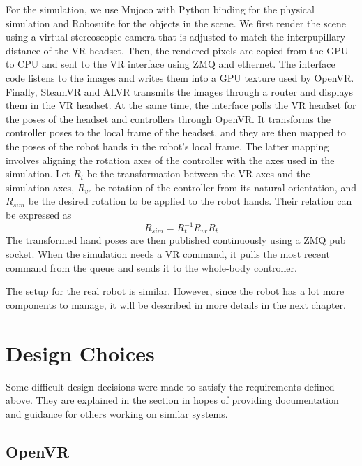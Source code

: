 For the simulation, we use Mujoco with Python binding for the physical simulation and Robosuite for the objects in the scene. We first render the scene using a virtual stereoscopic camera that is adjusted to match the interpupillary distance of the VR headset. Then, the rendered pixels are copied from the GPU to CPU and sent to the VR interface using ZMQ and ethernet. The interface code listens to the images and writes them into a GPU texture used by OpenVR. Finally, SteamVR and ALVR transmits the images through a router and displays them in the VR headset. At the same time, the interface polls the VR headset for the poses of the headset and controllers through OpenVR. It transforms the controller poses to the local frame of the headset, and they are then mapped to the poses of the robot hands in the robot's local frame. The latter mapping involves aligning the rotation axes of the controller with the axes used in the simulation. Let $R_t$ be the transformation between the VR axes and the simulation axes, $R_{vr}$ be rotation of the controller from its natural orientation, and $R_{sim}$ be the desired rotation to be applied to the robot hands. Their relation can be expressed as 
$$
R_{sim} = R_t^{-1} R_{vr} R_t
$$
The transformed hand poses are then published continuously using a ZMQ pub socket. When the simulation needs a VR command, it pulls the most recent command from the queue and sends it to the whole-body controller. 

The setup for the real robot is similar. However, since the robot has a lot more components to manage, it will be described in more details in the next chapter.

\section{Design Choices}

Some difficult design decisions were made to satisfy the requirements defined above. They are explained in the section in hopes of providing documentation and guidance for others working on similar systems.

\subsection{OpenVR}

